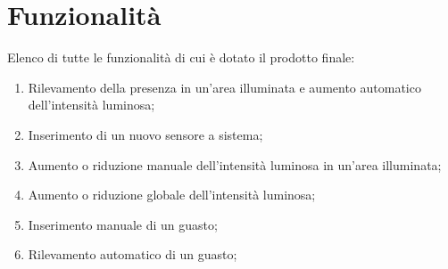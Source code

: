 \section{Funzionalità}
Elenco di tutte le funzionalità di cui è dotato il prodotto finale:
\begin{enumerate}
    \item Rilevamento della presenza in un'area illuminata e aumento automatico dell'intensità luminosa;
    \item Inserimento di un nuovo sensore a sistema;
    \item Aumento o riduzione manuale dell'intensità luminosa in un'area illuminata;
    \item Aumento o riduzione globale dell'intensità luminosa;
    \item Inserimento manuale di un guasto;
    \item Rilevamento automatico di un guasto;
\end{enumerate}
